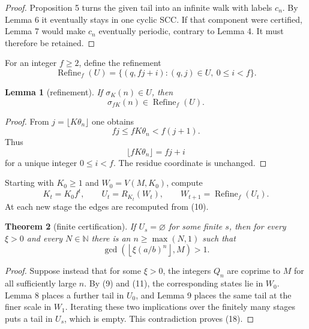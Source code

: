 \documentclass[11pt,reqno]{amsart}
\newtheorem{theorem}{Theorem}
\newtheorem{lemma}[theorem]{Lemma}
\theoremstyle{definition}
\theoremstyle{remark}
\begin{document}
\begin{proof}\leavevmode\label{proof:8}
Proposition 5 turns the given tail into an infinite walk with
labels \(c_n\). By Lemma 6 it eventually stays in one cyclic SCC. If
that component were certified, Lemma 7 would make \(c_n\) eventually
periodic, contrary to Lemma 4. It must therefore be retained. \qedhere
\end{proof}

For an integer \(f\ge2\), define the refinement
\[
\operatorname{Refine}_f(U)
=\{(q,fj+i):(q,j)\in U,\ 0\le i<f\}.
\tag{16}\label{eq:16}
\]

\begin{samepage}
\begin{lemma}[refinement]\leavevmode\label{thm:9}
If \(\sigma_K(n)\in U\), then
\[
\sigma_{fK}(n)\in\operatorname{Refine}_f(U).
\]
\label{thm-end:9}
\end{lemma}
\end{samepage}

\begin{proof}\leavevmode\label{proof:9}
From \(j=\lfloor K\theta_n\rfloor\) one obtains
\[
fj\le fK\theta_n<f(j+1).
\]
Thus
\[
\lfloor fK\theta_n\rfloor=fj+i
\]
for a unique integer
\(0\le i<f\). The residue coordinate is unchanged. \qedhere
\end{proof}

Starting with \(K_0\ge1\) and \(W_0=V(M,K_0)\), compute
\[
K_t=K_0f^t,\qquad U_t=R_{K_t}(W_t),\qquad
W_{t+1}=\operatorname{Refine}_f(U_t).
\tag{17}\label{eq:17}
\]
At each new stage the edges are recomputed from (10).

\begin{samepage}
\begin{theorem}[finite certification]\leavevmode\label{thm:10}
If \(U_s=\varnothing\) for some
finite \(s\), then for every \(\xi>0\) and every \(N\in\mathbb N\)
there is an \(n\ge\max(N,1)\) such that
\[
\gcd\!\left(\left\lfloor\xi(a/b)^n\right\rfloor,M\right)>1.
\tag{18}\label{eq:18}
\]
\label{thm-end:10}
\end{theorem}
\end{samepage}

\begin{proof}\leavevmode\label{proof:10}
Suppose instead that for some \(\xi>0\), the integers \(Q_n\)
are coprime to \(M\) for all sufficiently large \(n\). By (9) and (11),
the corresponding states lie in \(W_0\). Lemma 8 places a further tail
in \(U_0\), and Lemma 9 places the same tail at the finer scale in
\(W_1\). Iterating these two implications over the finitely many stages
puts a tail in \(U_s\), which is empty. This contradiction proves (18).
\qedhere
\end{proof}
\end{document}
